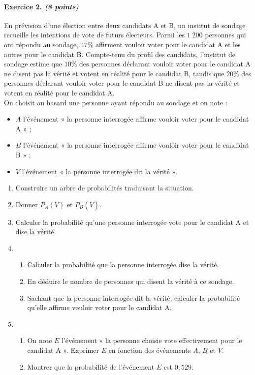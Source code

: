 \documentclass[11pt]{article}
\begin{document}
\paragraph{Exercice 2. \emph{(8 points)}}
En prévision d’une élection entre deux candidats A et B, un institut de
sondage recueille les intentions de vote de futurs électeurs. Parmi les $1\;200$
personnes qui ont répondu au sondage, $47$\% affirment vouloir voter pour le
candidat A et les autres pour le candidat B.
Compte-tenu du profil des candidats, l’institut de sondage estime que $10$\% des personnes déclarant
vouloir voter pour le candidat A ne disent pas la vérité et votent en réalité
pour le candidat B, tandis que $20$\% des personnes déclarant vouloir voter
pour le candidat B ne disent pas la vérité et votent en réalité
pour le candidat A.\\[5mm]
On choisit au hasard une personne ayant répondu au sondage et on note :
\begin{itemize}
  \item $A$ l'événement « la personne interrogée affirme vouloir voter pour le
    candidat A » ;
  \item $B$ l'événement « la personne interrogée affirme vouloir voter pour le
    candidat B » ;
  \item $V$ l'événement « la personne interrogée dit la vérité ».
\end{itemize}
\begin{enumerate}
  \item Construire un arbre de probabilités traduisant la situation.
  \item Donner $P_A(V)$ et $P_B(\overline V)$.
  \item Calculer la probabilité qu'une personne interrogée vote pour le candidat
    A et dise la vérité.
  \item \begin{enumerate}
      \item Calculer la probabilité que la personne interrogée dise la vérité.
      \item En déduire le nombre de personnes qui disent la vérité à ce sondage.
      \item Sachant que la personne interrogée dit la vérité, calculer la
        probabilité qu'elle affirme vouloir voter pour le candidat A.
    \end{enumerate}
  \item \begin{enumerate}
      \item On note $E$ l'événement « la personne choisie vote effectivement
        pour le candidat A ». Exprimer $E$ en fonction des événements $A$, $B$
        et $V$.
      \item Montrer que la probabilité de l'événement $E$ est $0,529$.
    \end{enumerate}
\end{enumerate}
\end{document}
